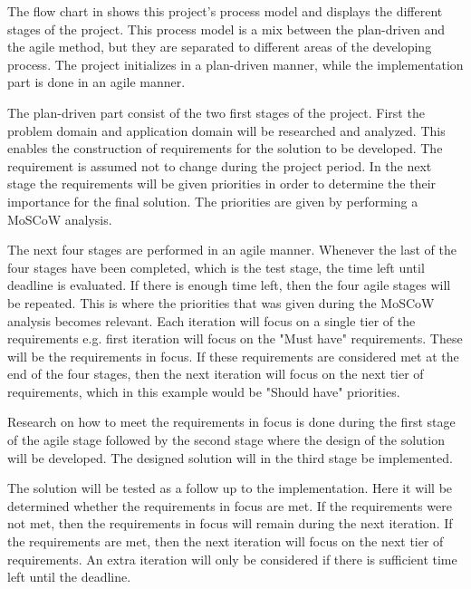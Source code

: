 The flow chart in  shows this project's process model and displays the different stages of the project. This process model is a mix between the plan-driven and the agile method, but they are separated to different areas of the developing process. The project initializes in a plan-driven manner, while the implementation part is done in an agile manner.

The plan-driven part consist of the two first stages of the project. First the problem domain and application domain will be researched and analyzed. This enables the construction of requirements for the solution to be developed. The requirement is assumed not to change during the project period. In the next stage the requirements will be given priorities in order to determine the their importance for the final solution. The priorities are given by performing a MoSCoW analysis.

The next four stages are performed in an agile manner. Whenever the last of the four stages have been completed, which is the test stage, the time left until deadline is evaluated. If there is enough time left, then the four agile stages will be repeated. This is where the priorities that was given during the MoSCoW analysis becomes relevant. Each iteration will focus on a single tier of the requirements e.g. first iteration will focus on the "Must have" requirements. These will be the requirements in focus. If these requirements are considered met at the end of the four stages, then the next iteration will focus on the next tier of requirements, which in this example would be "Should have" priorities.

Research on how to meet the requirements in focus is done during the first stage of the agile stage followed by the second stage where the design of the solution will be developed. The designed solution will in the third stage be implemented.

The solution will be tested as a follow up to the implementation. Here it will be determined whether the requirements in focus are met. If the requirements were not met, then the requirements in focus will remain during the next iteration. If the requirements are met, then the next iteration will focus on the next tier of requirements. An extra iteration will only be considered if there is sufficient time left until the deadline.

